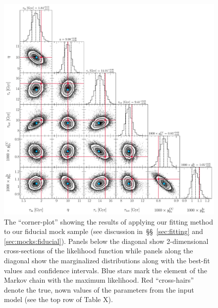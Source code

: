 \documentclass[ms.tex]{subfiles}
\begin{document}
\begin{figure}
\centering
\includegraphics[scale = 0.5]{fiducial_76k8.pdf}
\caption{
The ``corner-plot'' showing the results of applying our fitting method to our
fiducial mock sample (see discussion in~\S\S~\ref{sec:fitting} and
\ref{sec:mocks:fiducial}).
Panels below the diagonal show 2-dimensional cross-sections of the likelihood
function while panels along the diagonal show the marginalized distributions
along with the best-fit values and confidence intervals.
Blue stars mark the element of the Markov chain with the maximum likelihood.
Red ``cross-hairs'' denote the true, nown values of the parameters from the
input model (see the top row of Table X).
}
\label{fig:fiducial_mock_corner}
\end{figure}
\end{document}
